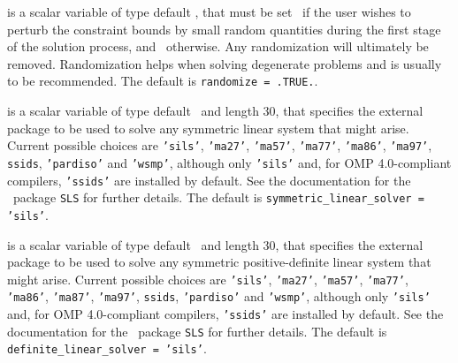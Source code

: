 \begin{description}

 is a scalar variable of type default \logical, that
must be set \true\ if the user wishes to perturb the constraint bounds
by small random quantities during the first stage of the solution process,
and \false\ otherwise.
Any randomization will ultimately be removed. Randomization
helps when solving degenerate problems and is usually to be recommended.
The default is {\tt randomize = .TRUE.}.


 is a scalar variable of type default \character\
and length 30, that specifies the external package to be used to
solve any symmetric linear system that might arise. Current possible
choices are {\tt 'sils'}, {\tt 'ma27'}, {\tt 'ma57'}, {\tt 'ma77'},
{\tt 'ma86'}, {\tt 'ma97'}, {\tt ssids}, {\tt 'pardiso'}
and {\tt 'wsmp'},
although only {\tt 'sils'} and, for OMP 4.0-compliant compilers,
{\tt 'ssids'} are installed by default.
See the documentation for the \galahad\ package {\tt SLS} for further details.
The default is {\tt symmetric\_linear\_solver = 'sils'}.

 is a scalar variable of type default \character\
and length 30, that specifies the external package to be used to
solve any symmetric positive-definite linear system that might arise.
Current possible
choices are {\tt 'sils'}, {\tt 'ma27'}, {\tt 'ma57'}, {\tt 'ma77'},
{\tt 'ma86'}, {\tt 'ma87'}, {\tt 'ma97'}, {\tt ssids}, {\tt 'pardiso'}
and {\tt 'wsmp'},
although only {\tt 'sils'} and, for OMP 4.0-compliant compilers,
{\tt 'ssids'} are installed by default.
See the documentation for the \galahad\ package {\tt SLS} for further details.
The default is {\tt definite\_linear\_solver = 'sils'}.


\end{description}
